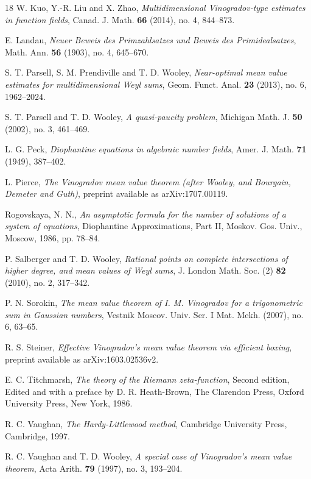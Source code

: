 \documentclass[12pt,reqno]{amsart}
\theoremstyle{definition}
\theoremstyle{remark}
\numberwithin{equation}{section}
\begin{document}
\begin{thebibliography}{18}
W. Kuo, Y.-R. Liu and X. Zhao, \emph{Multidimensional Vinogradov-type estimates in function 
fields}, Canad. J. Math. \textbf{66} (2014), no. 4, 844--873.

E. Landau, \emph{Neuer Beweis des Primzahlsatzes und Beweis des Primidealsatzes}, 
Math. Ann. \textbf{56} (1903), no. 4, 645--670.

S. T. Parsell, S. M. Prendiville and T. D. Wooley, \emph{Near-optimal mean value estimates 
for multidimensional Weyl sums}, Geom. Funct. Anal. \textbf{23} (2013), no. 6, 1962--2024.

S. T. Parsell and T. D. Wooley, \emph{A quasi-paucity problem}, Michigan Math. J.
\textbf{50} (2002), no. 3, 461--469.

L. G. Peck, \emph{Diophantine equations in algebraic number fields}, Amer. J. Math. 
\textbf{71} (1949), 387--402.

L. Pierce, \emph{The Vinogradov mean value theorem (after Wooley, and Bourgain, 
Demeter and Guth)}, preprint available as arXiv:1707.00119.

Rogovskaya, N. N., \emph{An asymptotic formula for the number of solutions of a system 
of equations}, Diophantine Approximations, Part II, Moskov. Gos. Univ., Moscow, 1986, pp. 
78--84.

P. Salberger and T. D. Wooley, \emph{Rational points on complete intersections of higher 
degree, and mean values of Weyl sums}, J. London Math. Soc. (2) \textbf{82} (2010), 
no. 2, 317--342.

P. N. Sorokin, \emph{The mean value theorem of I. M. Vinogradov for a trigonometric sum 
in Gaussian numbers}, Vestnik Moscov. Univ. Ser. I Mat. Mekh. (2007), no. 6, 63--65.

R. S. Steiner, \emph{Effective Vinogradov's mean value theorem via efficient boxing},  
preprint available as arXiv:1603.02536v2.

E. C. Titchmarsh, \emph{The theory of the Riemann zeta-function}, Second edition, Edited 
and with a preface by D. R. Heath-Brown, The Clarendon Press, Oxford University Press, 
New York, 1986.

R. C. Vaughan, \emph{The Hardy-Littlewood method}, Cambridge University Press, 
Cambridge, 1997.

R. C. Vaughan and T. D. Wooley, \emph{A special case of Vinogradov's mean value 
theorem}, Acta Arith. \textbf{79} (1997), no. 3, 193--204.


\end{thebibliography}
\end{document}
